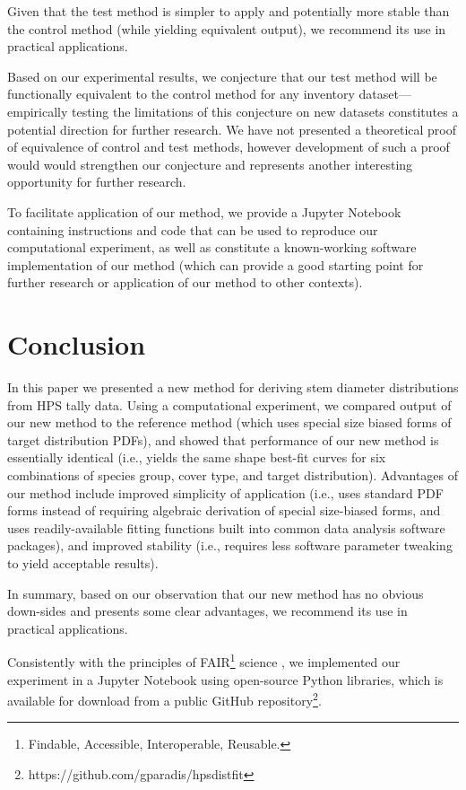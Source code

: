 \documentclass{foresj}
\begin{document}
Given that the test method is simpler to apply and potentially more
stable than the control method (while yielding equivalent output), we
recommend its use in practical applications.

Based on our experimental results, we conjecture that our test method will be
functionally equivalent to the control method for any inventory
dataset---empirically testing the limitations of this conjecture on new
datasets constitutes a potential direction for further research.
We have not presented a theoretical proof of equivalence of control
and test methods, however development of such a proof would would
strengthen our conjecture and represents another interesting opportunity for further research.

To facilitate application of our method, we provide a Jupyter Notebook
containing instructions and code that can be used to
reproduce our computational experiment, as well as constitute a
known-working software implementation of our method (which can provide
a good starting point for further research or application of our method to other contexts).

\section{Conclusion}
\label{sec:conclusion}

  In this paper we presented a new method for deriving stem diameter
  distributions from HPS tally data.
  Using a computational experiment, we compared output of our new
  method to the reference method (which uses special size biased forms
  of target distribution PDFs), and showed that performance of our new
  method is essentially identical (i.e., yields the same shape
  best-fit curves for six combinations of species group, cover
  type, and target distribution).
  Advantages of our method include improved simplicity of application (i.e.,
  uses standard PDF forms instead of requiring algebraic derivation of
  special size-biased forms, and uses readily-available fitting
  functions built into common data analysis software packages), and improved stability
  (i.e., requires less software parameter tweaking to yield acceptable
  results).

  In summary, based on our observation that our new method has no
  obvious down-sides and presents some clear advantages, we recommend
  its use in practical applications. 

  Consistently with the principles of FAIR\footnote{Findable,
    Accessible, Interoperable, Reusable.} science
  \citep{stall2019make, wilkinson2016fair}, we implemented our
  experiment in a Jupyter Notebook using open-source Python libraries,
  which is available for download from a public GitHub
  repository\footnote{https://github.com/gparadis/hpsdistfit}.
  
\end{document}
